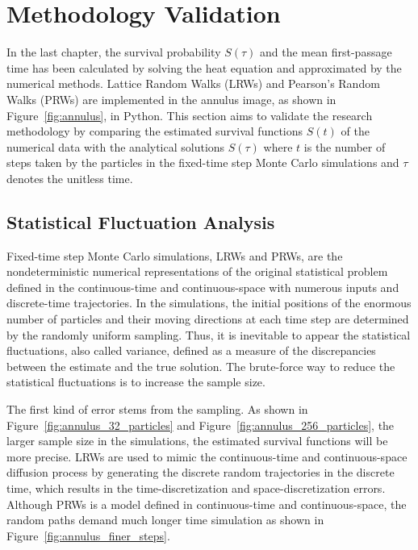 \section{Methodology Validation}

In the last chapter, the survival probability $S(\tau)$ and the mean
first-passage time has been calculated by solving the heat equation
and approximated by the numerical methods. Lattice Random Walks (LRWs)
and Pearson's Random Walks (PRWs) are implemented in the annulus
image, as shown in Figure~\ref{fig:annulus}, in Python. This section
aims to validate the research methodology by comparing the estimated
survival functions $S(t)$ of the numerical data with the analytical
solutions $S(\tau)$ where $t$ is the number of steps taken by the
particles in the fixed-time step Monte Carlo simulations and $\tau$
denotes the unitless time.


\subsection{Statistical Fluctuation Analysis}

Fixed-time step Monte Carlo simulations, LRWs and PRWs, are the
nondeterministic numerical representations of the original statistical
problem defined in the continuous-time and continuous-space with
numerous inputs and discrete-time trajectories. In the simulations,
the initial positions of the enormous number of particles and their
moving directions at each time step are determined by the randomly
uniform sampling. Thus, it is inevitable to appear the statistical
fluctuations, also called variance, defined as a measure of the
discrepancies between the estimate and the true solution. The
brute-force way to reduce the statistical fluctuations is to increase
the sample size.


The first kind of error stems from the sampling. As shown in
Figure~\ref{fig:annulus_32_particles} and
Figure~\ref{fig:annulus_256_particles}, the larger sample size in the
simulations, the estimated survival functions will be more
precise. LRWs are used to mimic the continuous-time and
continuous-space diffusion process by generating the discrete random
trajectories in the discrete time, which results in the
time-discretization and space-discretization errors. Although PRWs is
a model defined in continuous-time and continuous-space, the random
paths demand much longer time simulation as shown in
Figure~\ref{fig:annulus_finer_steps}.

